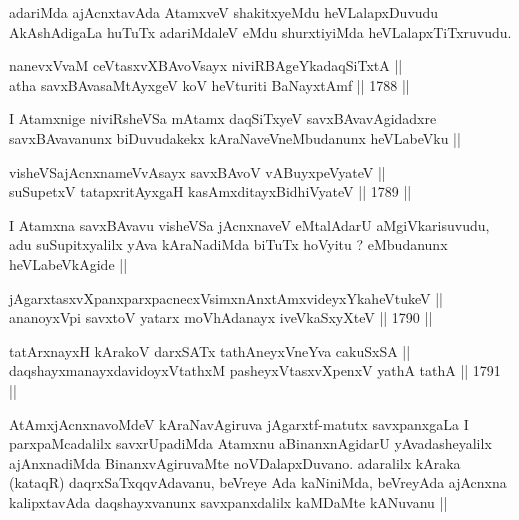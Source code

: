 \begin{artha}
adariMda ajAcnxtavAda AtamxveV shakitxyeMdu heVLalapxDuvudu
AkAshAdigaLa huTuTx adariMdaleV eMdu shurxtiyiMda heVLalapxTiTxruvudu.
\end{artha}



\begin{shl}
nanevxVvaM ceVtasxvXBAvoV\s sayx niviRBAgeYkadaqSiTxtA || \\
atha savxBAvasaMtAyxgeV koV heVturiti BaNayxtAmf ||  1788 ||  
\end{shl}

\begin{artha}
I Atamxnige niviRsheVSa mAtamx daqSiTxyeV savxBAvavAgidadxre
savxBAvavanunx biDuvudakekx kAraNaveVneMbudanunx heVLabeVku ||
\end{artha}

\begin{shl}
visheVSajAcnxnameVvAsayx savxBAvoV vA\s BuyxpeVyateV || \\
suSupetxV tatapxritAyxgaH kasAmxditayxBidhiVyateV ||  1789 ||  
\end{shl}

\begin{artha}
I Atamxna savxBAvavu visheVSa jAcnxnaveV eMtalAdarU aMgiVkarisuvudu,
adu suSupitxyalilx yAva kAraNadiMda biTuTx hoVyitu ? eMbudanunx
heVLabeVkAgide ||
\end{artha}


\begin{shl}
jAgarxtasxvXpanxparxpacnecxV\s simxnAnxtAmxvideyxYkaheVtukeV || \\
ananoyxV\s pi savxtoV yatarx moVhAdanayx iveVkaSxyXteV ||  1790 ||  
\end{shl}
				
\begin{shl}
tatArxnayxH kArakoV darxSATx tathA\s neyxVneYva cakuSxSA || \\
daqshayxmanayxdavidoyxVtathxM pasheyxVtasxvXpenxV yathA tathA ||  1791 ||  
\end{shl}

\begin{artha}
AtAmxjAcnxnavoMdeV kAraNavAgiruva jAgarxtf-matutx savxpanxgaLa I
parxpaMcadalilx savxrUpadiMda Atamxnu aBinanxnAgidarU yAvadasheyalilx
ajAnxnadiMda BinanxvAgiruvaMte noVDalapxDuvano. adaralilx kAraka
(kataqR) daqrxSaTxqqvAdavanu, beVreye Ada kaNiniMda, beVreyAda
ajAcnxna kalipxtavAda daqshayxvanunx savxpanxdalilx kaMDaMte kANuvanu ||
\end{artha}

